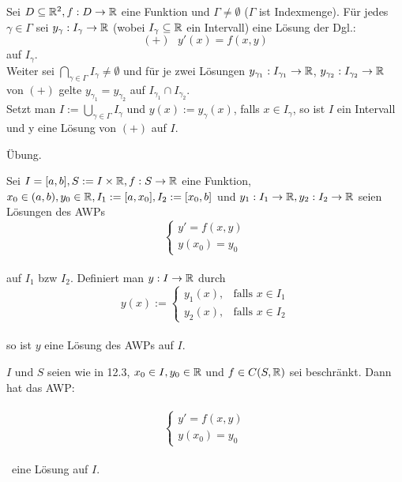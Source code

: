 \documentclass{article}
\begin{document}
\begin{satz}
Sei $D \subseteq \mathbb{R}^2, f: D \to \mathbb{R}$ eine Funktion und $\Gamma \neq \emptyset$ ($\Gamma$ ist Indexmenge). 
Für jedes $\gamma \in \Gamma$ sei $y_{\gamma}: I_{\gamma} \to \mathbb{R}$ (wobei $I_{\gamma} \subseteq \mathbb{R}$ ein Intervall) eine Lösung der Dgl.: $$(+)\text{ } y'(x) = f(x,y)$$ 
auf $I_{\gamma}$.\\ 
Weiter sei $\bigcap_{\gamma \in \Gamma} I_{\gamma} \neq \emptyset$ und für je zwei Lösungen $y_{\gamma_1}: I_{\gamma_1} \to \mathbb{R}$, $y_{\gamma_2}: I_{\gamma_2} \to \mathbb{R}$ von $(+)$ gelte 
$y_{\gamma_1} = y_{\gamma_2}$ auf $I_{\gamma_1} \cap I_{\gamma_2}$.\\
Setzt man $I := \bigcup_{\gamma \in \Gamma} I_{\gamma}$ und $y(x) := y_{\gamma}(x)$, falls $x \in I_{\gamma}$, so ist $I$ ein Intervall und y eine Lösung von $(+)$
auf $I$. 
\end{satz}

\begin{beweis}
Übung.
\end{beweis}

\begin{folgerung}
Sei $I = [a,b], S:= I \times \mathbb{R}, f:S \to \mathbb{R}$ eine Funktion, $x_0 \in (a,b), y_0 \in \mathbb{R}, I_1 := [a,x_0], I_2 := [x_0,b]$ und 
$y_1: I_1 \to \mathbb{R}, y_2: I_2 \to \mathbb{R}$ seien Lösungen des AWPs \\
$$\begin{cases} y' = f(x,y) \\ y(x_0) = y_0 \end{cases}$$ \\ auf $I_1$ bzw $I_2$. Definiert man $y:I \to \mathbb{R}$ durch \\
$$y(x):=
\begin{cases}
y_1(x), & \text{falls } x \in I_1  \\
y_2(x), & \text{falls } x \in I_2
\end{cases}$$\\
so ist $y$ eine Lösung des AWPs auf $I$.
\end{folgerung}

\begin{satz}
$I$ und $S$ seien wie in 12.3, $x_0 \in I, y_0 \in \mathbb{R}$ und $ f \in C(S,\mathbb{R})$ sei beschränkt.
Dann hat das AWP: \\\ $$\begin{cases} y' = f(x,y) \\ y(x_0) = y_0 \end{cases}$$ \\\ eine Lösung auf $I$. \\
\end{satz}
\end{document}

